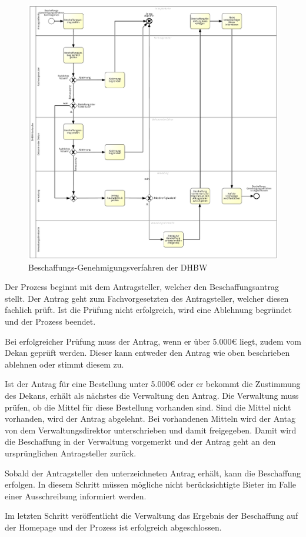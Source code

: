 \begin{figure}[h!tbp]
	\includegraphics[width=\textwidth]{images/beschaffungs-genehmigungsverfahren.png}
	\centering
	\caption{Beschaffungs-Genehmigungsverfahren der \gls{DHBW}}
	\label{fig:beschaffungsverfahren}
\end{figure}

Der Prozess beginnt mit dem Antragsteller, welcher den Beschaffungsantrag stellt.
Der Antrag geht zum Fachvorgesetzten des Antragsteller, welcher diesen fachlich prüft.
Ist die Prüfung nicht erfolgreich, wird eine Ablehnung begründet und der Prozess beendet.

Bei erfolgreicher Prüfung muss der Antrag, wenn er über 5.000€ liegt, zudem vom Dekan geprüft werden.
Dieser kann entweder den Antrag wie oben beschrieben ablehnen oder stimmt diesem zu.

Ist der Antrag für eine Bestellung unter 5.000€ oder er bekommt die Zustimmung des Dekans, erhält als nächstes die Verwaltung den Antrag.
Die Verwaltung muss prüfen, ob die Mittel für diese Bestellung vorhanden sind.
Sind die Mittel nicht vorhanden, wird der Antrag abgelehnt.
Bei vorhandenen Mitteln wird der Antag von dem Verwaltungsdirektor unterschrieben und damit freigegeben.
Damit wird die Beschaffung in der Verwaltung vorgemerkt und der Antrag geht an den ursprünglichen Antragsteller zurück.

Sobald der Antragsteller den unterzeichneten Antrag erhält, kann die Beschaffung erfolgen.
In diesem Schritt müssen mögliche nicht berücksichtigte Bieter im Falle einer Ausschreibung informiert werden.

Im letzten Schritt veröffentlicht die Verwaltung das Ergebnis der Beschaffung auf der Homepage und der Prozess ist erfolgreich abgeschlossen.
